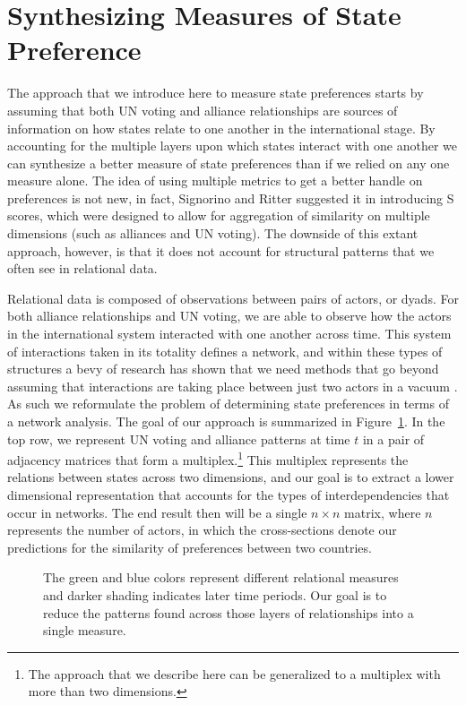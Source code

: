 \section*{Synthesizing Measures of State Preference}

The approach that we introduce here to measure state preferences starts by assuming that both UN voting and alliance relationships are sources of information on how states relate to one another in the international stage. By accounting for the multiple layers upon which states interact with one another we can synthesize a better measure of state preferences than if we relied on any one measure alone. The idea of using multiple metrics to get a better handle on preferences is not new, in fact, Signorino and Ritter suggested it in introducing S scores, which were designed to allow for aggregation of similarity on multiple dimensions (such as alliances and UN voting). The downside of this extant approach, however, is that it does not account for structural patterns that we often see in relational data. 

Relational data is composed of observations between pairs of actors, or dyads. For both alliance relationships and UN voting, we are able to observe how the actors in the international system  interacted with one another across time. This system of interactions taken in its totality defines a network, and within these types of structures a bevy of research has shown that we need methods that go beyond assuming that interactions are taking place between just two actors in a vacuum \citep{wasserman:faust:1994,snijders:nowicki:1997}. As such we reformulate the problem of determining state preferences in terms of a network analysis. The goal of our approach is summarized in Figure~\ref{fig:tensViz}. In the top row, we represent UN voting and alliance patterns at time $t$ in a pair of adjacency matrices that form a multiplex.\footnote{The approach that we describe here can be generalized to a multiplex with more than two dimensions.} This multiplex represents the relations between states across two dimensions, and our goal is to extract a lower dimensional representation that accounts for the types of interdependencies that occur in networks. The end result then will be a single $n \times n$ matrix, where $n$ represents the number of actors, in which the cross-sections denote our predictions for the similarity of preferences between two countries.

\begin{figure}[ht]
	\centering
	\resizebox{.8\textwidth}{!}{}
	\caption{The green and blue colors represent different relational measures and darker shading indicates later time periods. Our goal is to reduce the patterns found across those layers of relationships into a single measure.}
	\label{fig:tensViz}
\end{figure}

